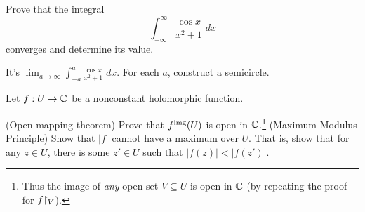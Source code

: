 \begin{problem}
	\yod
	Prove that the integral
	\[
		\int_{-\infty}^{\infty} \frac{\cos x}{x^2+1} \; dx
	\]
	converges and determine its value.
	\begin{hint}
		It's $\lim_{a \to \infty} \int_{-a}^{a} \frac{\cos x}{x^2+1} \; dx$.
		For each $a$, construct a semicircle.
	\end{hint}

\end{problem}

\begin{sproblem}
	\gim
	Let $f : U \to \mathbb C$ be a nonconstant holomorphic function.
	\begin{enumerate}[(a)]
		\ii (Open mapping theorem)
		Prove that $f^{\text{img}}(U)$ is open in $\mathbb C$.\footnote{%
			Thus the image of \emph{any}
			open set $V \subseteq U$ is open in $\mathbb C$
			(by repeating the proof for $f \restrict{V}$).
		}
		\ii (Maximum Modulus Principle)
		Show that $\left\lvert f \right\rvert$
		cannot have a maximum over $U$.
		That is, show that for any $z \in U$, there is some $z' \in U$
		such that $\left\lvert f(z) \right\rvert < \left\lvert f(z') \right\rvert$.
	\end{enumerate}
\end{sproblem}
